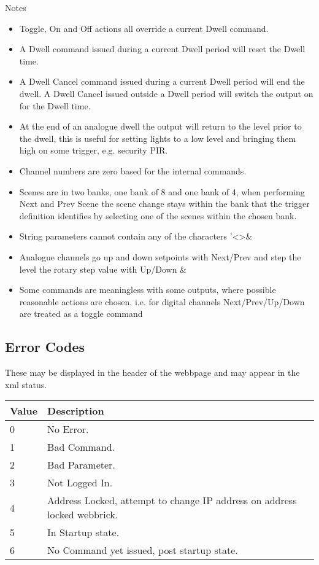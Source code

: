 Notes
\begin{itemize}
\item Toggle, On and Off actions all override a current Dwell command.
\item A Dwell command issued during a current Dwell period will reset the Dwell time.
\item A Dwell Cancel command issued during a current Dwell period will end the dwell. A Dwell Cancel issued 
outside a Dwell period will switch the output on for the Dwell time.
\item At the end of an analogue dwell the output will return to the level prior to the dwell, this 
is useful for setting lights
to a low level and bringing them high on some trigger, e.g. security PIR.
\item Channel numbers are zero based for the internal commands.
\item Scenes are in two banks, one bank of 8 and one bank of 4, when performing Next and Prev Scene the scene change 
stays within the bank that the trigger definition identifies by selecting one of the scenes within the chosen bank.
\item String parameters cannot contain any of the characters '\textless{}\textgreater{}\&
\item Analogue channels go up and down setpoints with Next/Prev and step the level the rotary step value with Up/Down \&
\item Some commands are meaningless with some outputs, where possible reasonable actions are chosen. i.e. for digital 
channels Next/Prev/Up/Down are treated as a toggle command\\
\end{itemize}

\subsection{Error Codes}
These may be displayed in the header of the webbpage and may appear in the xml status.

    \begin{tabular}{l|l}
    Value&Description\\
    \hline
    0&No Error.\\
	1&Bad Command.\\
	2&Bad Parameter.\\
	3&Not Logged In.\\
	4&Address Locked, attempt to change IP address on address locked webbrick.\\
	5&In Startup state.\\
	6&No Command yet issued, post startup state.\\
    \end{tabular}
	
